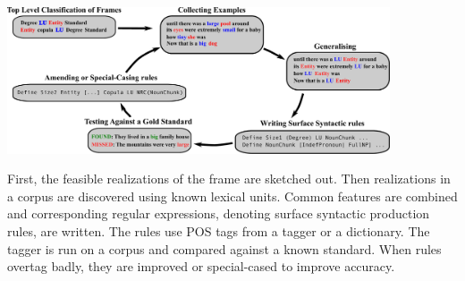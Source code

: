 \documentclass[25pt, a0papper, portrait]{tikzposter}
\begin{document}
 {
   \begin{center}
     \includegraphics[width=0.85\textwidth]{images/sigma.pdf}

   \end{center}
\vspace{1cm}
\begin{changemargin}{5cm}{5cm} 

First, the feasible realizations of the frame are sketched out.
Then realizations in a corpus are discovered using known lexical units.
Common features are combined and corresponding regular expressions, 
denoting surface syntactic production rules, are written. The rules
use POS tags from a tagger or a dictionary.
The tagger is run on a corpus and compared against a known standard.
When rules overtag badly, they are improved or special-cased to improve accuracy.
\end{changemargin} 

 }

\end{document}
